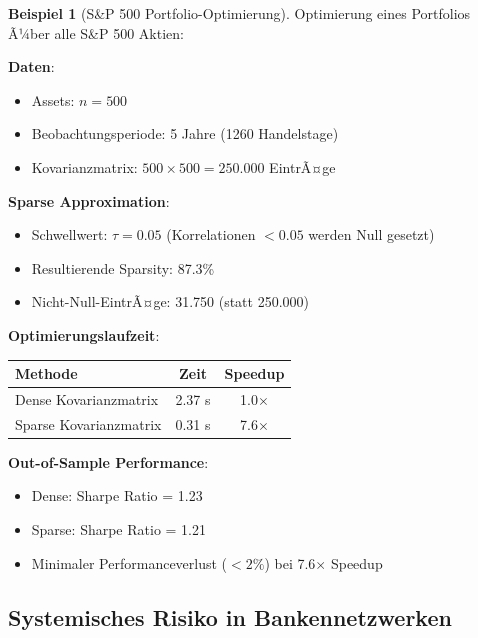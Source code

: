 ﻿\documentclass[a4paper,12pt]{report}
\theoremstyle{definition}
\newtheorem{beispiel}{Beispiel}
\begin{document}
	\begin{beispiel}[S\&P 500 Portfolio-Optimierung]
		Optimierung eines Portfolios Ã¼ber alle S\&P 500 Aktien:
		
		\textbf{Daten}:
		\begin{itemize}
			\item Assets: $n = 500$
			\item Beobachtungsperiode: 5 Jahre (1260 Handelstage)
			\item Kovarianzmatrix: $500 \times 500 = 250.000$ EintrÃ¤ge
		\end{itemize}
		
		\textbf{Sparse Approximation}:
		\begin{itemize}
			\item Schwellwert: $\tau = 0.05$ (Korrelationen $< 0.05$ werden Null gesetzt)
			\item Resultierende Sparsity: 87.3\%
			\item Nicht-Null-EintrÃ¤ge: 31.750 (statt 250.000)
		\end{itemize}
		
		\textbf{Optimierungslaufzeit}:
		\begin{center}
			\begin{tabular}{|l|c|c|}
				\hline
				\textbf{Methode} & \textbf{Zeit} & \textbf{Speedup} \\
				\hline
				Dense Kovarianzmatrix & 2.37 s & 1.0$\times$ \\
				Sparse Kovarianzmatrix & 0.31 s & 7.6$\times$ \\
				\hline
			\end{tabular}
		\end{center}
		
		\textbf{Out-of-Sample Performance}:
		\begin{itemize}
			\item Dense: Sharpe Ratio = 1.23
			\item Sparse: Sharpe Ratio = 1.21
			\item Minimaler Performanceverlust ($< 2\%$) bei 7.6$\times$ Speedup
		\end{itemize}
	\end{beispiel}
	
	\subsection{Systemisches Risiko in Bankennetzwerken}
	
\end{document}
